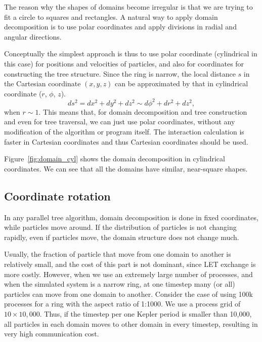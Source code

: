 \documentclass[oribibl]{llncs}
\begin{document}
The reason why the shapes of domains become irregular is that we are
trying to fit a circle to squares and rectangles. A natural way to
apply domain decomposition is to use polar coordinates and apply
divisions in radial and angular directions.

Conceptually the simplest approach is thus to use polar coordinate
(cylindrical in this case) for positions and velocities of particles,
and also for coordinates for constructing the tree structure. Since
the ring is narrow, the local distance $s$ in the Cartesian coordinate
$(x, y, z)$ can be approximated by that in cylindrical coordinate
($r$, $\phi$, $z$).
\begin{equation}
  \label{eq:metric}
  ds^2 = dx^2 + dy^2 + dz^2 \sim d\phi ^2 + dr^2 + dz^2,
\end{equation}
when $r \sim 1$. This means that, for domain decomposition and tree
construction and even for tree traversal, we can just use polar
coordinates, without any modification of the algorithm or program
itself. The interaction calculation is faster in Cartesian
coordinates and thus Cartesian coordinates should be used.

Figure~\ref{fig:domain_cyl} shows the domain decomposition in
cylindrical coordinates. We can see that all the domains have similar,
near-square shapes.

\subsection{Coordinate rotation}
\label{subsec:exptcl}
 
In any parallel tree algorithm, domain decomposition is done in fixed
coordinates, while particles move around. If the distribution of
particles is not changing rapidly, even if particles move, the domain
structure does not change much.

Usually, the fraction of particle that move from one domain to
another is relatively small, and the cost of this part is not
dominant, since LET exchange is more costly. However, when we use
an extremely large number of processes, and when the simulated system is
a narrow ring, at one timestep many (or all) particles can move from
one domain to another. Consider the case of using 100k processes for a
ring with the aspect ratio of 1:1000. We use a process grid of
$10\times 10,000$. Thus, if the timestep per one Kepler period is
smaller than 10,000, all particles in each domain moves to other
domain in every timestep, resulting in very high communication cost.
\end{document}
